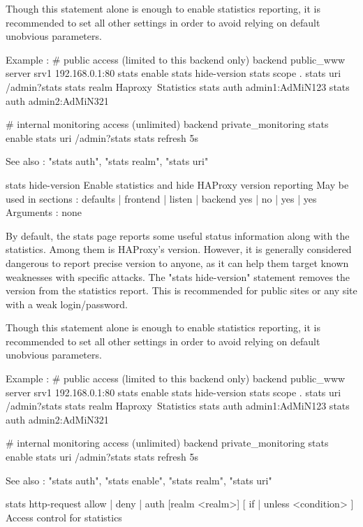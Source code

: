   Though this statement alone is enough to enable statistics reporting, it is
  recommended to set all other settings in order to avoid relying on default
  unobvious parameters.

  Example :
    # public access (limited to this backend only)
    backend public_www
        server srv1 192.168.0.1:80
        stats enable
        stats hide-version
        stats scope   .
        stats uri     /admin?stats
        stats realm   Haproxy\ Statistics
        stats auth    admin1:AdMiN123
        stats auth    admin2:AdMiN321

    # internal monitoring access (unlimited)
    backend private_monitoring
        stats enable
        stats uri     /admin?stats
        stats refresh 5s

  See also : "stats auth", "stats realm", "stats uri"


stats hide-version
  Enable statistics and hide HAProxy version reporting
  May be used in sections :   defaults | frontend | listen | backend
                                 yes   |    no    |   yes  |   yes
  Arguments : none

  By default, the stats page reports some useful status information along with
  the statistics. Among them is HAProxy's version. However, it is generally
  considered dangerous to report precise version to anyone, as it can help them
  target known weaknesses with specific attacks. The "stats hide-version"
  statement removes the version from the statistics report. This is recommended
  for public sites or any site with a weak login/password.

  Though this statement alone is enough to enable statistics reporting, it is
  recommended to set all other settings in order to avoid relying on default
  unobvious parameters.

  Example :
    # public access (limited to this backend only)
    backend public_www
        server srv1 192.168.0.1:80
        stats enable
        stats hide-version
        stats scope   .
        stats uri     /admin?stats
        stats realm   Haproxy\ Statistics
        stats auth    admin1:AdMiN123
        stats auth    admin2:AdMiN321

    # internal monitoring access (unlimited)
    backend private_monitoring
        stats enable
        stats uri     /admin?stats
        stats refresh 5s

  See also : "stats auth", "stats enable", "stats realm", "stats uri"


stats http-request { allow | deny | auth [realm <realm>] }
             [ { if | unless } <condition> ]
  Access control for statistics

